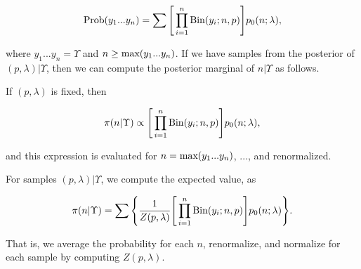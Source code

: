 \documentclass[codesnippet]{jss}
\begin{document}
$$\textnormal{Prob} (y_1...y_n) = \sum \Bigg[ \prod_{i=1}^{n} \textnormal{Bin} (y_i; n, p) \Bigg] p_0(n; \lambda),$$

where $y_1...y_n = \Upsilon$ and $n \geq \textnormal{max} (y_1...y_n)$. If we have samples from the posterior of $(p, \lambda) | \Upsilon$, then we can compute the posterior marginal of $n | \Upsilon$ as follows. 

If $(p, \lambda)$ is fixed, then

$$\pi (n | \Upsilon) \propto \Bigg[ \prod_{i=1}^{n} \textnormal{Bin} (y_i; n, p) \Bigg] p_0 (n; \lambda),$$

and this expression is evaluated for $n=\textnormal{max}(y_1...y_n)$, ..., and renormalized. 

For samples $(p, \lambda) | \Upsilon$, we compute the expected value, as 

$$\pi (n | \Upsilon) = \sum \Bigg\{ \frac{1}{Z(p,\lambda)}  \Bigg[ \prod_{i=1}^{n} \textnormal{Bin} (y_i; n, p) \Bigg] p_0 (n; \lambda) \Bigg\}.$$

That is, we average the probability for each $n$, renormalize, and normalize for each sample by computing $Z (p, \lambda)$. 
	
	
\end{document}
